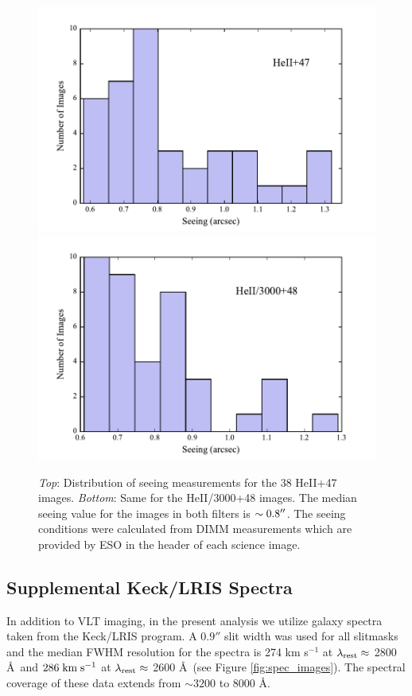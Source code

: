 \documentclass[twocolumn]{aastex62}
\def \mkms {{\rm \; km\;s^{-1}}}
\begin{document}
\begin{figure}[h]
\centering
\includegraphics[scale=.55]{figure3a.pdf}
\includegraphics[scale=.55]{figure3b.pdf}
\caption{\emph{Top}: Distribution of seeing measurements for the 38 HeII+47 images.
\emph{Bottom}: Same for the HeII/3000+48 images. The median seeing value for the images in both filters is $\sim 0.8\mbox{$^{\prime\prime}$}$. 
The seeing conditions were calculated from DIMM measurements which are provided by ESO in the header of each science image.
\label{fig.seeing}}
\end{figure}

\subsection{Supplemental Keck/LRIS Spectra}
In addition to VLT imaging, in the present analysis we utilize galaxy spectra taken from the \cite{Rubin_2014} Keck/LRIS program.  A $0.9''$ slit width was used for all slitmasks and the median FWHM resolution for the spectra is 274 km s$^{-1}$ at $\lambda_{\rm rest} \approx$ 2800 \AA\ and $286\mkms$  at $\lambda_{\rm rest}\approx$ 2600 \AA\ (see Figure \ref{fig:spec_images}).  The spectral coverage of these data extends from ${\sim}3200$ to 8000 \AA.
\end{document}
